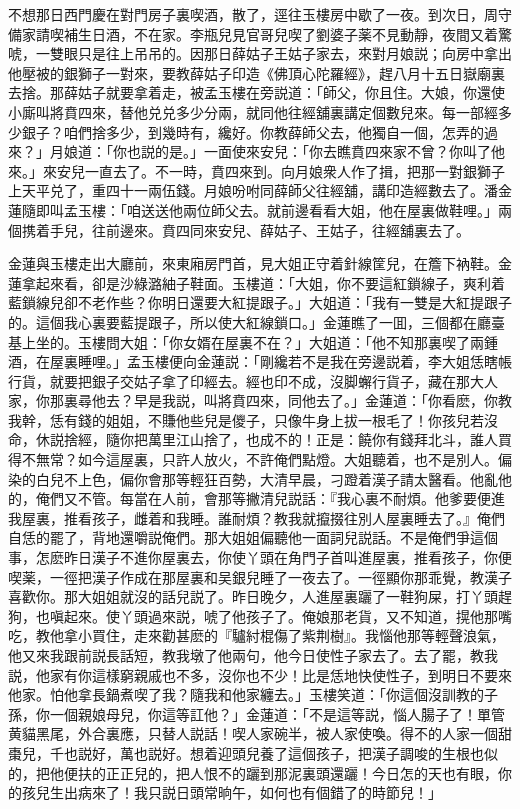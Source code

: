 不想那日西門慶在對門房子裏喫酒，散了，逕往玉樓房中歇了一夜。到次日，周守備家請喫補生日酒，不在家。李瓶兒見官哥兒喫了劉婆子薬不見動靜，夜間又着驚唬，一雙眼只是往上吊吊的。因那日薛姑子王姑子家去，來對月娘説；向房中拿出他壓被的銀獅子一對來，要教薛姑子印造《佛頂心陀羅經》，趕八月十五日嶽廟裏去捨。那薛姑子就要拿着走，被孟玉樓在旁説道：「師父，你且住。大娘，你還使小廝叫將賁四來，替他兑兑多少分兩，就同他往經舖裏講定個數兒來。每一部經多少銀子？咱們捨多少，到幾時有，纔好。你教薛師父去，他獨自一個，怎弄的過來？」月娘道：「你也説的是。」一面使來安兒：「你去瞧賁四來家不曾？你叫了他來。」來安兒一直去了。不一時，賁四來到。向月娘衆人作了揖，把那一對銀獅子上天平兑了，重四十一兩伍錢。月娘吩咐同薛師父往經舖，講印造經數去了。潘金蓮隨即叫孟玉樓：「咱送送他兩位師父去。就前邊看看大姐，他在屋裏做鞋哩。」兩個携着手兒，往前邊來。賁四同來安兒、薛姑子、王姑子，往經舖裏去了。

金蓮與玉樓走出大廳前，來東廂房門首，見大姐正守着針線筐兒，在簷下衲鞋。金蓮拿起來看，卻是沙綠潞紬子鞋面。玉樓道：「大姐，你不要這紅鎖線子，爽利着藍鎖線兒卻不老作些？你明日還要大紅提跟子。」大姐道：「我有一雙是大紅提跟子的。這個我心裏要藍提跟子，所以使大紅線鎖口。」金蓮瞧了一囬，三個都在廳臺基上坐的。玉樓問大姐：「你女婿在屋裏不在？」大姐道：「他不知那裏喫了兩鍾酒，在屋裏睡哩。」孟玉樓便向金蓮説：「剛纔若不是我在旁邊説着，李大姐恁瞎帳行貨，就要把銀子交姑子拿了印經去。經也印不成，沒脚蠏行貨子，藏在那大人家，你那裏尋他去？早是我説，叫將賁四來，同他去了。」金蓮道：「你看麽，你教我幹，恁有錢的姐姐，不賺他些兒是儍子，只像牛身上拔一根毛了！你孩兒若沒命，休説捨經，隨你把萬里江山捨了，也成不的！正是：饒你有錢拜北斗，誰人買得不無常？如今這屋裏，只許人放火，不許俺們點燈。大姐聽着，也不是別人。偏染的白兒不上色，偏你會那等輕狂百勢，大清早晨，刁蹬着漢子請太醫看。他亂他的，俺們又不管。每當在人前，會那等撇清兒説話：『我心裏不耐煩。他爹要便進我屋裏，推看孩子，雌着和我睡。誰耐煩？教我就攛掇往別人屋裏睡去了。』俺們自恁的罷了，背地還嚼説俺們。那大姐姐偏聽他一面詞兒説話。不是俺們爭這個事，怎麽昨日漢子不進你屋裏去，你使丫頭在角門子首叫進屋裏，推看孩子，你便喫薬，一徑把漢子作成在那屋裏和吴銀兒睡了一夜去了。一徑顯你那乖覺，教漢子喜歡你。那大姐姐就沒的話兒説了。昨日晚夕，人進屋裏躧了一鞋狗屎，打丫頭趕狗，也嗔起來。使丫頭過來説，唬了他孩子了。俺娘那老貨，又不知道，㨪他那嘴吃，教他拿小買住，走來勸甚麽的『驢紂棍傷了紫荆樹』。我惱他那等輕聲浪氣，他又來我跟前説長話短，教我墩了他兩句，他今日使性子家去了。去了罷，教我説，他家有你這樣窮親戚也不多，沒你也不少！比是恁地快使性子，到明日不要來他家。怕他拿長鍋煮喫了我？隨我和他家纏去。」玉樓笑道：「你這個沒訓教的子孫，你一個親娘母兒，你這等訌他？」金蓮道：「不是這等説，惱人腸子了！單管黄貓黑尾，外合裏應，只替人説話！喫人家碗半，被人家使喚。得不的人家一個甜棗兒，千也説好，萬也説好。想着迎頭兒養了這個孩子，把漢子調唆的生根也似的，把他便扶的正正兒的，把人恨不的躧到那泥裏頭還躧！今日怎的天也有眼，你的孩兒生出病來了！我只説日頭常晌午，如何也有個錯了的時節兒！」

